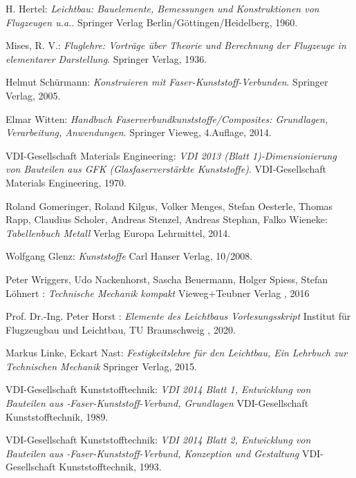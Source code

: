 \begingroup
\renewcommand{\section}[2]{}%
\begin{thebibliography}{99}          
	H. Hertel:
	\textit {Leichtbau: Bauelemente, Bemessungen und Konstruktionen von Flugzeugen u.a.}.
	Springer Verlag Berlin/Göttingen/Heidelberg, 1960.
	
	Mises, R. V.:
	\textit {Fluglehre: Vorträge über Theorie und Berechnung der Flugzeuge in elementarer Darstellung}.
	Springer Verlag, 1936.
	
	Helmut Schürmann:
	\textit {Konstruieren mit Faser-Kunststoff-Verbunden}.
	Springer Verlag, 2005.
	
	Elmar Witten:
	\textit {Handbuch Faserverbundkunststoffe/Composites: Grundlagen, Verarbeitung, Anwendungen}.
	Springer Vieweg, 4.Auflage, 2014.
	
	VDI-Gesellschaft Materials Engineering:
	\textit{VDI 2013 (Blatt 1)-Dimensionierung von Bauteilen aus GFK (Glasfaserverstärkte Kunststoffe)}.
	VDI-Gesellschaft Materials Engineering, 1970.
	
	Roland Gomeringer, Roland Kilgus, Volker Menges, Stefan Oesterle, Thomas Rapp, Claudius Scholer, Andreas Stenzel, Andreas Stephan, Falko Wieneke:
	\textit{Tabellenbuch Metall}
	Verlag Europa Lehrmittel, 2014.
	
	Wolfgang Glenz:
	\textit{Kunststoffe}
	Carl Hanser Verlag, 10/2008.
	
	Peter Wriggers, Udo Nackenhorst, Sascha Beuermann, Holger Spiess, Stefan Löhnert :
	\textit{Technische Mechanik kompakt}
	Vieweg+Teubner Verlag , 2016
	
	Prof. Dr.-Ing. Peter Horst :
	\textit{Elemente des Leichtbaus Vorlesungsskript}
	Institut für Flugzeugbau und Leichtbau, TU Braunschweig , 2020.

	Markus Linke, Eckart Nast:
	\textit{Festigkeitslehre für den Leichtbau, Ein Lehrbuch zur Technischen Mechanik}
	Springer Verlag, 2015.
	
	VDI-Gesellschaft Kunststofftechnik:
	\textit{VDI 2014 Blatt 1, Entwicklung von Bauteilen aus -Faser-Kunststoff-Verbund, Grundlagen}
	VDI-Gesellschaft Kunststofftechnik, 1989.

	VDI-Gesellschaft Kunststofftechnik:
	\textit{VDI 2014 Blatt 2, Entwicklung von Bauteilen aus -Faser-Kunststoff-Verbund, Konzeption und Gestaltung}
	VDI-Gesellschaft Kunststofftechnik, 1993.
	

\end{thebibliography}
